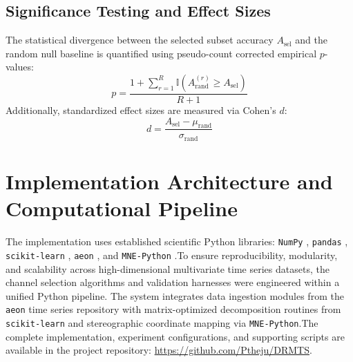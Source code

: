 \subsection{Significance Testing and Effect Sizes}
\noindent
The statistical divergence between the selected subset accuracy $A_{\text{sel}}$ and the random null baseline is quantified using pseudo-count corrected empirical $p$-values:
\begin{equation}
    p = \frac{1 + \sum_{r=1}^R \mathbb{I}\left( A_{\text{rand}}^{(r)} \ge A_{\text{sel}} \right)}{R + 1}
\end{equation}
Additionally, standardized effect sizes are measured via Cohen's $d$:
\begin{equation}
    d = \frac{A_{\text{sel}} - \mu_{\text{rand}}}{\sigma_{\text{rand}}}
\end{equation}
\section{Implementation Architecture and Computational Pipeline}
\label{sec:implementation_architecture}

\noindent
The implementation uses established scientific Python libraries:
\texttt{NumPy} \citep{harris2020numpy},
\texttt{pandas} \citep{mckinney2010pandas},
\texttt{scikit-learn} \citep{pedregosa2011sklearn},
\texttt{aeon} \citep{middlehurst2024aeon}, and
\texttt{MNE-Python} \citep{gramfort2013mne}.To ensure reproducibility, modularity, and scalability across high-dimensional multivariate time series datasets, the channel selection algorithms and validation harnesses were engineered within a unified Python pipeline. The system integrates data ingestion modules from the \texttt{aeon} time series repository with matrix-optimized decomposition routines from \texttt{scikit-learn} and stereographic coordinate mapping via \texttt{MNE-Python}.The complete implementation, experiment configurations, and supporting
scripts are available in the project repository:
\url{https://github.com/Ptheju/DRMTS}.

